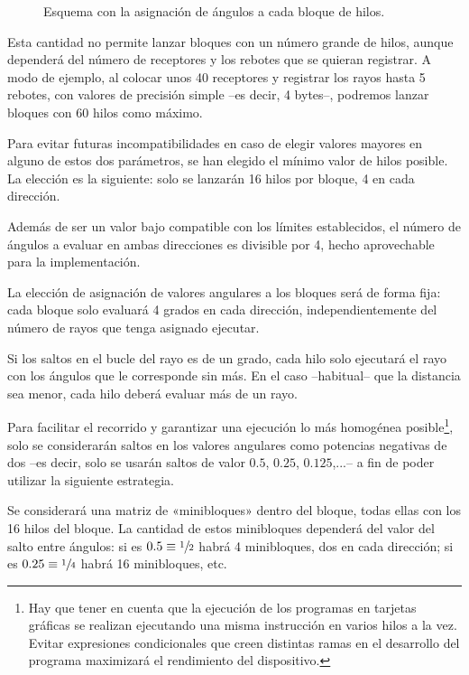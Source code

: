 \begin{figure}[H]
    \centering
    
    \vspace*{-0.75cm}
    \caption{Esquema con la asignación de ángulos a cada bloque de hilos.}
    \label{fig:CUDA_angulos}
\end{figure}

Esta cantidad no permite lanzar bloques con un número grande de hilos, aunque dependerá del número de receptores y los rebotes que se quieran registrar.
A modo de ejemplo, al colocar unos 40 receptores y registrar los rayos hasta 5 rebotes, con valores de precisión simple --es decir, 4 bytes--, podremos lanzar bloques con 60 hilos como máximo.

Para evitar futuras incompatibilidades en caso de elegir valores mayores en alguno de estos dos parámetros, se han elegido el mínimo valor de hilos posible.
La elección es la siguiente: solo se lanzarán 16 hilos por bloque, 4 en cada dirección.

Además de ser un valor bajo compatible con los límites establecidos, el número de ángulos a evaluar en ambas direcciones es divisible por 4, hecho aprovechable para la implementación.

La elección de asignación de valores angulares a los bloques será de forma fija: cada bloque solo evaluará 4 grados en cada dirección, independientemente del número de rayos que tenga asignado ejecutar.

Si los saltos en el bucle del rayo es de un grado, cada hilo solo ejecutará el rayo con los ángulos que le corresponde sin más.
En el caso --habitual-- que la distancia sea menor, cada hilo deberá evaluar más de un rayo.

Para facilitar el recorrido y garantizar una ejecución lo más homogénea posible\footnote{Hay que tener en cuenta que la ejecución de los programas en tarjetas gráficas se realizan ejecutando una misma instrucción en varios hilos a la vez. Evitar expresiones condicionales que creen distintas ramas en el desarrollo del programa maximizará el rendimiento del dispositivo.}, solo se considerarán saltos en los valores angulares como potencias negativas de dos --es decir, solo se usarán saltos de valor $0.5$, $0.25$, $0.125$,...-- a fin de poder utilizar la siguiente estrategia.

Se considerará una matriz de «minibloques» dentro del bloque, todas ellas con los 16 hilos del bloque.
La cantidad de estos minibloques dependerá del valor del salto entre ángulos: si es $0.5 \equiv \sfrac{1}{2}$ habrá 4 minibloques, dos en cada dirección; si es $0.25 \equiv \sfrac{1}{4}$ habrá 16 minibloques, etc.

